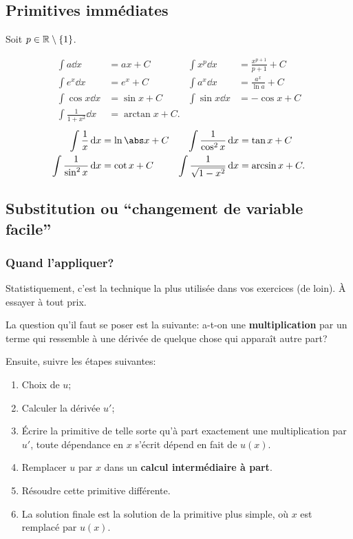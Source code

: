 \documentclass[main.tex]{subfiles}
\begin{document}
\subsection{Primitives immédiates}

\begin{proposition}

    Soit $p \in \mathbb{R} \setminus \{1\}$.

    \begin{align}
        \int a \dd x &= ax + C &
        \int x^p \dd x &= \frac {x^{p + 1}} {p + 1} + C\\
        \int e^x \dd x &= e^x + C &
        \int a^x \dd x &= \frac {a^x} {\ln a} + C\\
        \int \cos x \dd x &= \sin x + C &
        \int \sin x \dd x &= -\cos x + C\\
        \int \frac 1 {1 + x^2} \dd x &= \arctan x + C.
    \end{align}
    \begin{align}
        \int \frac 1 x \dd x &= \ln \abs x + C &
        \int \frac 1 {\cos^2 x} \dd x &= \tan x + C \\
        \int \frac 1 {\sin^2 x} \dd x &= \cot x + C &
        \int \frac 1 {\sqrt {1 - x^2}} \dd x &= \arcsin x + C.
    \end{align}
\end{proposition}

\subsection{Substitution ou ``changement de variable facile''}

\subsubsection{Quand l'appliquer?}

Statistiquement,
c'est la technique la plus utilisée dans vos exercices (de loin).
À essayer à tout prix.

La question qu'il faut se poser est la suivante:
a-t-on une \textbf{multiplication} par un terme qui ressemble à une dérivée de quelque chose qui apparaît autre part?

Ensuite, suivre les étapes suivantes:
\begin{enumerate}
    \item Choix de $u$;
    \item Calculer la dérivée $u'$;
    \item Écrire la primitive de telle sorte qu'à part exactement une multiplication par $u'$,
        toute dépendance en $x$ s'écrit dépend en fait de $u(x)$.
    \item Remplacer $u$ par $x$ dans un \textbf{calcul intermédiaire à part}.
    \item Résoudre cette primitive différente.
    \item La solution finale est la solution de la primitive plus simple,
        où $x$ est remplacé par $u(x)$.
\end{enumerate}
\end{document}
